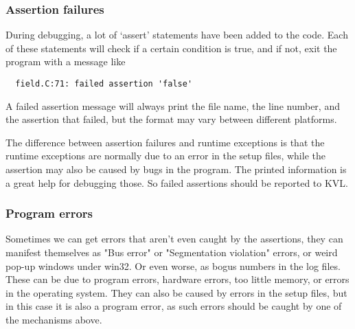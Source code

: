 \subsubsection{Assertion failures}

During debugging, a lot of `assert' statements have been added to the
code.  Each of these statements will check if a certain condition is
true, and if not, exit the program with a message like
\begin{verbatim}
  field.C:71: failed assertion 'false'
\end{verbatim}
A failed assertion message will always print the file name, the line
number, and the assertion that failed, but the format may vary between
different platforms.  

The difference between assertion failures and runtime exceptions is
that the runtime exceptions are normally due to an error in the setup
files, while the assertion may also be caused by bugs in the program.
The printed information is a great help for debugging those.  So
failed assertions should be reported to KVL.

\subsubsection{Program errors}

Sometimes we can get errors that aren't even caught by the assertions,
they can manifest themselves as "Bus error" or "Segmentation
violation" errors, or weird pop-up windows under win32.  Or even
worse, as bogus numbers in the log files.  These can be due to program
errors, hardware errors, too little memory, or errors in the operating
system.  They can also be caused by errors in the setup files, but in
this case it is also a program error, as such errors should be caught
by one of the mechanisms above.


